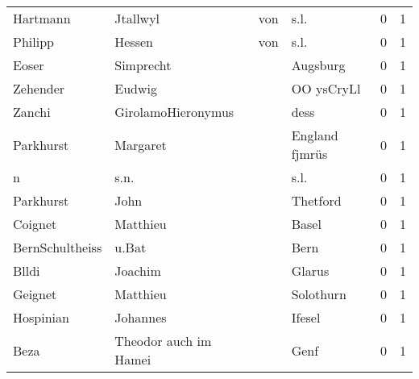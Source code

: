 \begin{tabular}{llllrr}
                 Hartmann &                           Jtallwyl &         von &                                        s.l. &          0 &         1 \\
                  Philipp &                             Hessen &         von &                                        s.l. &          0 &         1 \\
                    Eoser &                          Simprecht &             &                                    Augsburg &          0 &         1 \\
                 Zehender &                             Eudwig &             &                                  OO ysCryLl &          0 &         1 \\
                   Zanchi &                 GirolamoHieronymus &             &                                        dess &          0 &         1 \\
                Parkhurst &                           Margaret &             &                              England fjmrüs &          0 &         1 \\
                        n &                               s.n. &             &                                        s.l. &          0 &         1 \\
                Parkhurst &                               John &             &                                    Thetford &          0 &         1 \\
                  Coignet &                           Matthieu &             &                                       Basel &          0 &         1 \\
          BernSchultheiss &                              u.Bat &             &                                        Bern &          0 &         1 \\
                    Blldi &                            Joachim &             &                                      Glarus &          0 &         1 \\
                  Geignet &                           Matthieu &             &                                   Solothurn &          0 &         1 \\
                Hospinian &                           Johannes &             &                                      Ifesel &          0 &         1 \\
                     Beza &              Theodor auch im Hamei &             &                                        Genf &          0 &         1 \\

\end{tabular}
